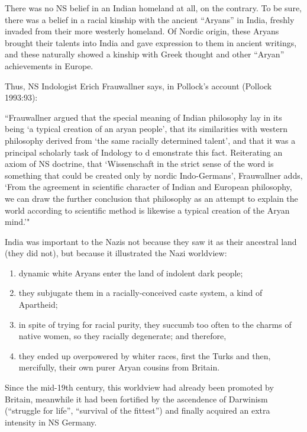 There was no NS belief in an Indian homeland at all, on the contrary. To be sure, there was a belief in a racial kinship with the ancient “Aryans” in India, freshly invaded from their more westerly homeland. Of Nordic origin, these Aryans brought their talents into India and gave expression to them in ancient writings, and these naturally showed a kinship with Greek thought and other “Aryan” achievements in Europe.

Thus, NS Indologist Erich Frauwallner says, in Pollock’s account (Pollock 1993:93): 
\newpage

\begin{myquote}
“Frauwallner argued that the special meaning of Indian philosophy lay in its being ‘a typical creation of an aryan people’, that its similarities with western philosophy derived from ‘the same racially determined talent’, and that it was a principal scholarly task of Indology to d emonstrate this fact. Reiterating an axiom of NS doctrine, that ‘Wissenschaft in the strict sense of the word is something that could be created only by nordic Indo-Germans’, Frauwallner adds, ‘From the agreement in scientific character of Indian and European philosophy, we can draw the further conclusion that philosophy as an attempt to explain the world according to scientific method is likewise a typical creation of the Aryan mind.’"
\end{myquote}

India was important to the Nazis not because they saw it as their ancestral land (they did not), but because it illustrated the Nazi worldview: 
{%
\begin{enumerate}
\item dynamic white Aryans enter the land of indolent dark people; 
\item they subjugate them in a racially-conceived caste system, a kind of Apartheid; 
\item in spite of trying for racial purity, they succumb too often to the charms of native women, so they racially degenerate; and therefore, 
\item they ended up overpowered by whiter races, first the Turks and then, mercifully, their own purer Aryan cousins from Britain. 
\end{enumerate}}
Since the mid-19th century, this worldview had already been promoted by Britain, meanwhile it had been fortified by the ascendence of Darwinism (“struggle for life”, “survival of the fittest”) and finally acquired an extra intensity in NS Germany.

